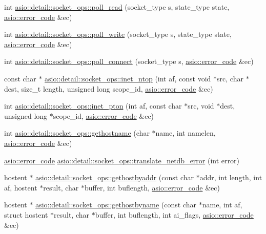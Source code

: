 \begin{DoxyCompactItemize}
\item 
int \hyperlink{namespaceasio_1_1detail_1_1socket__ops_a3441fa6568f3c39d69fe5abc8faf490e}{asio\+::detail\+::socket\+\_\+ops\+::poll\+\_\+read} (socket\+\_\+type s, state\+\_\+type state, \hyperlink{classasio_1_1error__code}{asio\+::error\+\_\+code} \&ec)
\item 
int \hyperlink{namespaceasio_1_1detail_1_1socket__ops_a1558f1c08d7848ba7497490caaf70144}{asio\+::detail\+::socket\+\_\+ops\+::poll\+\_\+write} (socket\+\_\+type s, state\+\_\+type state, \hyperlink{classasio_1_1error__code}{asio\+::error\+\_\+code} \&ec)
\item 
int \hyperlink{namespaceasio_1_1detail_1_1socket__ops_a8a31b0a147289e44de668e09863073e5}{asio\+::detail\+::socket\+\_\+ops\+::poll\+\_\+connect} (socket\+\_\+type s, \hyperlink{classasio_1_1error__code}{asio\+::error\+\_\+code} \&ec)
\item 
const char $\ast$ \hyperlink{namespaceasio_1_1detail_1_1socket__ops_a7779e2805d8f2799421f59319746a6a1}{asio\+::detail\+::socket\+\_\+ops\+::inet\+\_\+ntop} (int af, const void $\ast$src, char $\ast$dest, size\+\_\+t length, unsigned long scope\+\_\+id, \hyperlink{classasio_1_1error__code}{asio\+::error\+\_\+code} \&ec)
\item 
int \hyperlink{namespaceasio_1_1detail_1_1socket__ops_a605dc164e1020d739f5efb9bc1715baf}{asio\+::detail\+::socket\+\_\+ops\+::inet\+\_\+pton} (int af, const char $\ast$src, void $\ast$dest, unsigned long $\ast$scope\+\_\+id, \hyperlink{classasio_1_1error__code}{asio\+::error\+\_\+code} \&ec)
\item 
int \hyperlink{namespaceasio_1_1detail_1_1socket__ops_a2579b536222ee88f3aa50993568ab52c}{asio\+::detail\+::socket\+\_\+ops\+::gethostname} (char $\ast$name, int namelen, \hyperlink{classasio_1_1error__code}{asio\+::error\+\_\+code} \&ec)
\item 
\hyperlink{classasio_1_1error__code}{asio\+::error\+\_\+code} \hyperlink{namespaceasio_1_1detail_1_1socket__ops_a7b34f13d6fee250f34f8913f376dc39e}{asio\+::detail\+::socket\+\_\+ops\+::translate\+\_\+netdb\+\_\+error} (int error)
\item 
hostent $\ast$ \hyperlink{namespaceasio_1_1detail_1_1socket__ops_a2e62efda4d006d21f2f8be8a4de52f93}{asio\+::detail\+::socket\+\_\+ops\+::gethostbyaddr} (const char $\ast$addr, int length, int af, hostent $\ast$result, char $\ast$buffer, int buflength, \hyperlink{classasio_1_1error__code}{asio\+::error\+\_\+code} \&ec)
\item 
hostent $\ast$ \hyperlink{namespaceasio_1_1detail_1_1socket__ops_a1c349de482d0cad334869fabac9a2af1}{asio\+::detail\+::socket\+\_\+ops\+::gethostbyname} (const char $\ast$name, int af, struct hostent $\ast$result, char $\ast$buffer, int buflength, int ai\+\_\+flags, \hyperlink{classasio_1_1error__code}{asio\+::error\+\_\+code} \&ec)

\end{DoxyCompactItemize}
